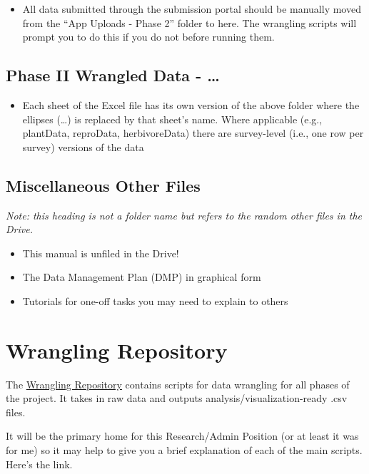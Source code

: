 \documentclass[
  letterpaper,
  oneside,
  open=any]{scrbook}
\providecommand{\tightlist}{%
  \setlength{\itemsep}{0pt}\setlength{\parskip}{0pt}}\usepackage{longtable,booktabs,array}
\begin{document}
\begin{itemize}
\tightlist
\item
  All data submitted through the submission portal should be manually
  moved from the ``App Uploads - Phase 2'' folder to here. The wrangling
  scripts will prompt you to do this if you do not before running them.
\end{itemize}

\section{Phase II Wrangled Data -
\ldots{}}\label{phase-ii-wrangled-data--}

\begin{itemize}
\tightlist
\item
  Each sheet of the Excel file has its own version of the above folder
  where the ellipses (\ldots) is replaced by that sheet's name. Where
  applicable (e.g., plantData, reproData, herbivoreData) there are
  survey-level (i.e., one row per survey) versions of the data
\end{itemize}

\section{Miscellaneous Other Files}\label{miscellaneous-other-files}

\emph{Note: this heading is not a folder name but refers to the random
other files in the Drive.}

\begin{itemize}
\tightlist
\item
  This manual is unfiled in the Drive!
\item
  The Data Management Plan (DMP) in graphical form
\item
  Tutorials for one-off tasks you may need to explain to others
\end{itemize}

\chapter{Wrangling Repository}\label{wrangling-repository}

The \href{https://github.com/HerbVar-Network/Wrangling}{Wrangling
Repository} contains scripts for data wrangling for all phases of the
project. It takes in raw data and outputs analysis/visualization-ready
.csv files.

It will be the primary home for this Research/Admin Position (or at
least it was for me) so it may help to give you a brief explanation of
each of the main scripts. Here's the link.
\end{document}
